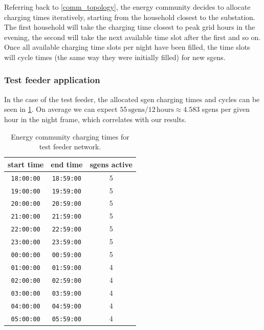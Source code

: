 \documentclass[a4paper,10pt]{report}
\begin{document}
Referring back to \cref{comm_topology}, the energy community decides to allocate charging times iteratively, starting from the household closest to the substation. The first household will take the charging time closest to peak grid hours in the evening, the second will take the next available time slot after the first and so on. Once all available charging time slots per night have been filled, the time slots will cycle times (the same way they were initially filled) for new sgens.

\subsubsection{Test feeder application}
In the case of the test feeder, the allocated sgen charging times and cycles can be seen in \cref{sgen_comm_times}. On average we can expect $55\, \text{sgens} / 12\, \text{hours} \approx 4.583$ sgens per given hour in the night frame, which correlates with our results.

\begin{table}[htpb]
	\centering
	\begin{tabular}{c c c}
		\toprule
		start time & end time & sgens active \\
		\midrule
		\texttt{18:00:00} & \texttt{18:59:00} & 5\\
		\texttt{19:00:00} & \texttt{19:59:00} & 5\\
		\texttt{20:00:00} & \texttt{20:59:00} & 5\\
		\texttt{21:00:00} & \texttt{21:59:00} & 5\\
		\texttt{22:00:00} & \texttt{22:59:00} & 5\\
		\texttt{23:00:00} & \texttt{23:59:00} & 5\\
		\texttt{00:00:00} & \texttt{00:59:00} & 5\\
		\texttt{01:00:00} & \texttt{01:59:00} & 4\\
		\texttt{02:00:00} & \texttt{02:59:00} & 4\\
		\texttt{03:00:00} & \texttt{03:59:00} & 4\\
		\texttt{04:00:00} & \texttt{04:59:00} & 4\\
		\texttt{05:00:00} & \texttt{05:59:00} & 4\\
		\bottomrule
	\end{tabular}
	\caption[Energy community charging times for test feeder network]{Energy community charging times for test feeder network.}
	\label{sgen_comm_times}
\end{table}
\end{document}
